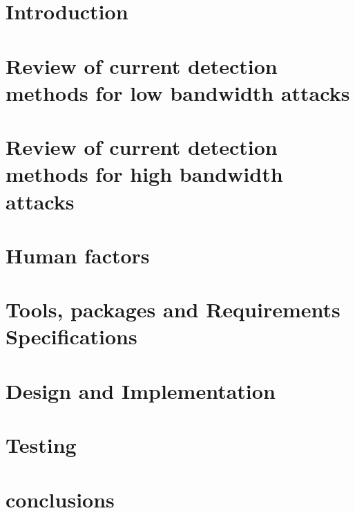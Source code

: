 \documentclass[11pt,twoside]{book}
\begin{document}
\frontmatter
%
%
%
%
\mainmatter
\chapter{Introduction}

\chapter{Review of current detection methods for low bandwidth attacks}

\chapter{Review of current detection methods for high bandwidth attacks}
 
\chapter{Human factors}\label{Human factors}

\chapter{Tools, packages and Requirements Specifications}
 \label{Errorcodes}
\chapter{Design and Implementation}

\chapter{Testing}

\chapter{conclusions}

\printbibliography
\appendix
%
\end{document}

